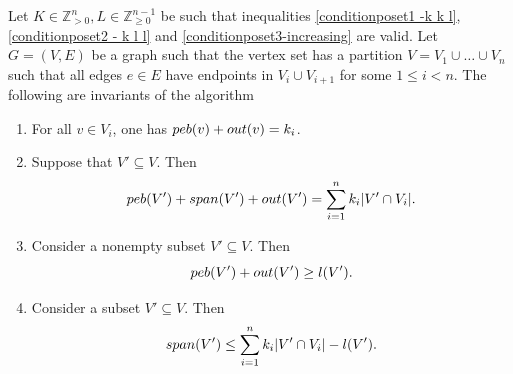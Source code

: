 \documentclass{article}
\begin{document}
\begin{lemma}\label{invariants - posets}
 Let $K\in \mathbb{Z}_{>0}^{n}, L\in \mathbb{Z}_{\geq 0}^{n-1}$ be such that inequalities \eqref{conditionposet1 -k k l}, \eqref{conditionposet2 - k l l} and \eqref{conditionposet3-increasing} are valid. Let $G=(V,E)$ be a graph such that the vertex set has a partition $V=V_1\cup \dots \cup V_n$ such that all edges $e\in E$ have endpoints in $V_{i} \cup V_{i+1}$ for some $1 \leq i < n$. The following are invariants of the algorithm
    \begin{enumerate}
        \item For all $v\in V_i$, one has $\peb(v)+ \out(v) = k_{i}$.
        \item Suppose that $V'\subseteq V$. Then $$\peb(V')+ \spa(V')+ \out(V') = \sum_{i=1}^{n} k_i \vert  V' \cap V_i  \vert.$$
        \item Consider a nonempty subset $V' \subseteq V$. Then $$\peb(V') + \out(V') \geq l(V').$$ 
    \item Consider a subset $V' \subseteq V$. Then $$\spa(V') \leq \sum_{i=1}^{n} k_i \vert  V' \cap V_i \vert - l(V').$$
    \end{enumerate}
\end{lemma}
\end{document}
